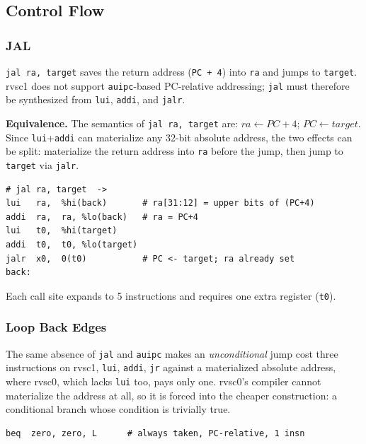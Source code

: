 \subsection{Control Flow} \label{sec:sc1-jump}

\subsubsection{JAL} \label{sec:sc1-jal}

\texttt{jal ra, target} saves the return address (\texttt{PC + 4}) into \texttt{ra} and jumps to
\texttt{target}. rvsc1 does not support \texttt{auipc}-based PC-relative addressing; \texttt{jal}
must therefore be synthesized from \texttt{lui}, \texttt{addi}, and \texttt{jalr}.

\textbf{Equivalence.} The semantics of \texttt{jal ra, target} are: $\mathit{ra} \leftarrow
\mathit{PC} + 4$; $\mathit{PC} \leftarrow \mathit{target}$. Since \texttt{lui}+\texttt{addi} can
materialize any 32-bit absolute address, the two effects can be split: materialize the return address
into \texttt{ra} before the jump, then jump to \texttt{target} via \texttt{jalr}.

\begin{lstlisting}
# jal ra, target  ->
lui   ra,  %hi(back)       # ra[31:12] = upper bits of (PC+4)
addi  ra,  ra, %lo(back)   # ra = PC+4
lui   t0,  %hi(target)
addi  t0,  t0, %lo(target)
jalr  x0,  0(t0)           # PC <- target; ra already set
back:
\end{lstlisting}

Each call site expands to 5 instructions and requires one extra register (\texttt{t0}).

\subsubsection{Loop Back Edges} \label{sec:sc1-backedge}

The same absence of \texttt{jal} and \texttt{auipc} makes an \textit{unconditional} jump cost three
instructions on rvsc1, \texttt{lui}, \texttt{addi}, \texttt{jr} against a materialized absolute
address, where rvsc0, which lacks \texttt{lui} too, pays only one. rvsc0's compiler cannot
materialize the address at all, so it is forced into the cheaper construction: a conditional branch
whose condition is trivially true.

\begin{lstlisting}
beq  zero, zero, L      # always taken, PC-relative, 1 insn
\end{lstlisting}

